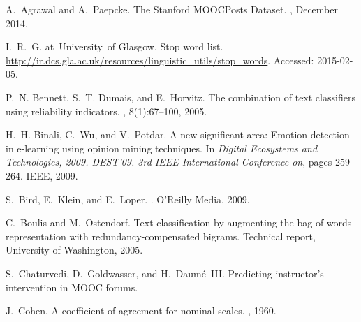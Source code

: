 \documentclass{edm_template}
\begin{document}


%
%
%
\begin{thebibliography}{10}
A.~Agrawal and A.~Paepcke.
\newblock The {Stanford} {MOOCP}osts {Dataset}.
, December
  2014.

I.~R.~G. at~University~of Glasgow.
\newblock Stop word list.
\newblock \url{http://ir.dcs.gla.ac.uk/resources/linguistic_utils/stop_words}.
\newblock Accessed: 2015-02-05.

P.~N. Bennett, S.~T. Dumais, and E.~Horvitz.
\newblock The combination of text classifiers using reliability indicators.
, 8(1):67--100, 2005.

H.~H. Binali, C.~Wu, and V.~Potdar.
\newblock A new significant area: Emotion detection in e-learning using opinion
  mining techniques.
\newblock In {\em Digital Ecosystems and Technologies, 2009. DEST'09. 3rd IEEE
  International Conference on}, pages 259--264. IEEE, 2009.

S.~Bird, E.~Klein, and E.~Loper.
.
\newblock O'Reilly Media, 2009.

C.~Boulis and M.~Ostendorf.
\newblock Text classification by augmenting the bag-of-words representation
  with redundancy-compensated bigrams.
\newblock Technical report, University of Washington, 2005.

S.~Chaturvedi, D.~Goldwasser, and H.~Daum{\'e}~III.
\newblock Predicting instructor's intervention in {MOOC} forums.

J.~Cohen.
\newblock A coefficient of agreement for nominal scales.
, 1960.


\end{thebibliography}
\end{document}
